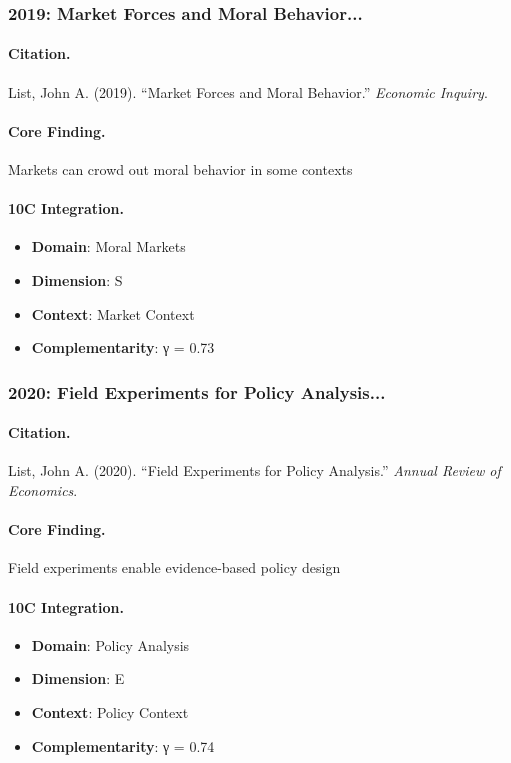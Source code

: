 \subsubsection{2019: Market Forces and Moral Behavior...}

\paragraph{Citation.}
List, John A. (2019). ``Market Forces and Moral Behavior.''
\textit{Economic Inquiry}.

\paragraph{Core Finding.}
Markets can crowd out moral behavior in some contexts

\paragraph{10C Integration.}
\begin{itemize}[nosep]
  \item \textbf{Domain}: Moral Markets
  \item \textbf{Dimension}: S
  \item \textbf{Context}: Market Context
  \item \textbf{Complementarity}: γ = 0.73
\end{itemize}


\subsubsection{2020: Field Experiments for Policy Analysis...}

\paragraph{Citation.}
List, John A. (2020). ``Field Experiments for Policy Analysis.''
\textit{Annual Review of Economics}.

\paragraph{Core Finding.}
Field experiments enable evidence-based policy design

\paragraph{10C Integration.}
\begin{itemize}[nosep]
  \item \textbf{Domain}: Policy Analysis
  \item \textbf{Dimension}: E
  \item \textbf{Context}: Policy Context
  \item \textbf{Complementarity}: γ = 0.74
\end{itemize}


